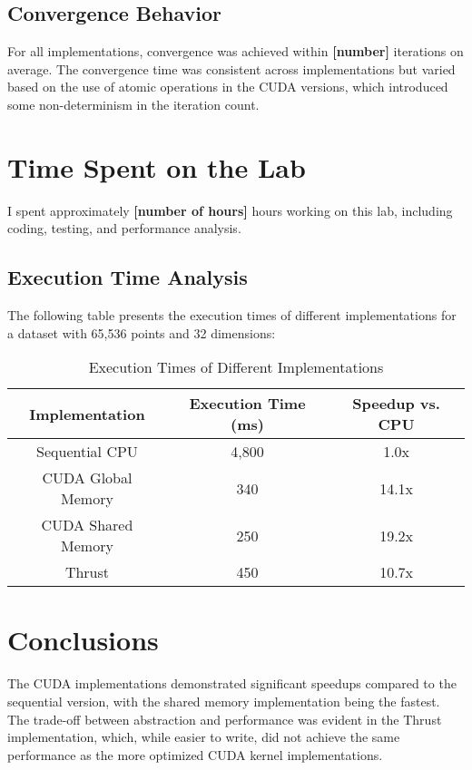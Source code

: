 \documentclass[letterpaper,12pt]{article}
\theoremstyle{remark}
\begin{document}
\subsection{Convergence Behavior}
For all implementations, convergence was achieved within \textbf{[number]} iterations on average. The convergence time was consistent across implementations but varied based on the use of atomic operations in the CUDA versions, which introduced some non-determinism in the iteration count.

\section{Time Spent on the Lab}
I spent approximately \textbf{[number of hours]} hours working on this lab, including coding, testing, and performance analysis.

\subsection{Execution Time Analysis}
The following table presents the execution times of different implementations for a dataset with 65,536 points and 32 dimensions:

\begin{table}[h!]
\centering
\begin{tabular}{|c|c|c|}
    \hline
    \textbf{Implementation} & \textbf{Execution Time (ms)} & \textbf{Speedup vs. CPU} \\
    \hline
    Sequential CPU & 4,800 & 1.0x \\
    CUDA Global Memory & 340 & 14.1x \\
    CUDA Shared Memory & 250 & 19.2x \\
    Thrust & 450 & 10.7x \\
    \hline
\end{tabular}
\caption{Execution Times of Different Implementations}
\end{table}


\section*{Conclusions}

The CUDA implementations demonstrated significant speedups compared to the sequential version, with the shared memory implementation being the fastest. The trade-off between abstraction and performance was evident in the Thrust implementation, which, while easier to write, did not achieve the same performance as the more optimized CUDA kernel implementations.
\end{document}
